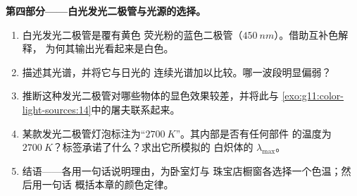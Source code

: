 \begin{problem}
\medskip
\noindent\textbf{第四部分——白光发光二极管与光源的选择。}
\begin{enumerate}[resume]
  \item 白光发光二极管是覆有黄色
        荧光粉的蓝色二极管（$\qty{450}{nm}$）。借助互补色解释，
        为何其输出光看起来是白色。
  \item 描述其光谱，并将它与日光的
        连续光谱加以比较。哪一波段明显偏弱？
  \item 推断这种发光二极管对哪些物体的显色效果较差，并将此与
        \cref{exo:g11:color-light-sources:14}中的屠夫联系起来。
  \item 某款发光二极管灯泡标注为“$\qty{2700}{K}$”。其内部是否有任何部件
        的温度为 $\qty{2700}{K}$？标签承诺了什么？求出它所模拟的
        白炽体的 $\lambda_{\max}$。
  \item 结语——各用一句话说明理由，为卧室灯与
        珠宝店橱窗各选择一个色温；然后用一句话
        概括本章的颜色定律。
\end{enumerate}
\end{problem}

